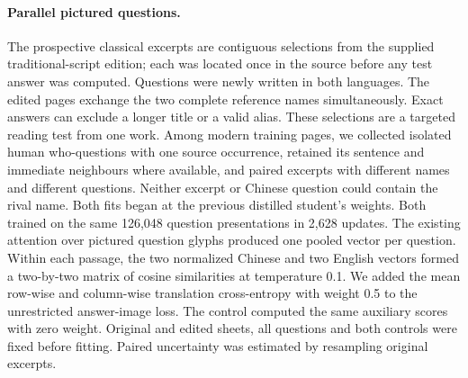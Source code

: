 \paragraph{Parallel pictured questions.}
The prospective classical excerpts are contiguous selections from the supplied traditional-script edition; each was located once in the source before any test answer was computed. Questions were newly written in both languages. The edited pages exchange the two complete reference names simultaneously. Exact answers can exclude a longer title or a valid alias. These selections are a targeted reading test from one work. Among modern training pages, we collected isolated human who-questions with one source occurrence, retained its sentence and immediate neighbours where available, and paired excerpts with different names and different questions. Neither excerpt or Chinese question could contain the rival name. Both fits began at the previous distilled student's weights. Both trained on the same 126,048 question presentations in 2,628 updates. The existing attention over pictured question glyphs produced one pooled vector per question. Within each passage, the two normalized Chinese and two English vectors formed a two-by-two matrix of cosine similarities at temperature 0.1. We added the mean row-wise and column-wise translation cross-entropy with weight 0.5 to the unrestricted answer-image loss. The control computed the same auxiliary scores with zero weight. Original and edited sheets, all questions and both controls were fixed before fitting. Paired uncertainty was estimated by resampling original excerpts.
